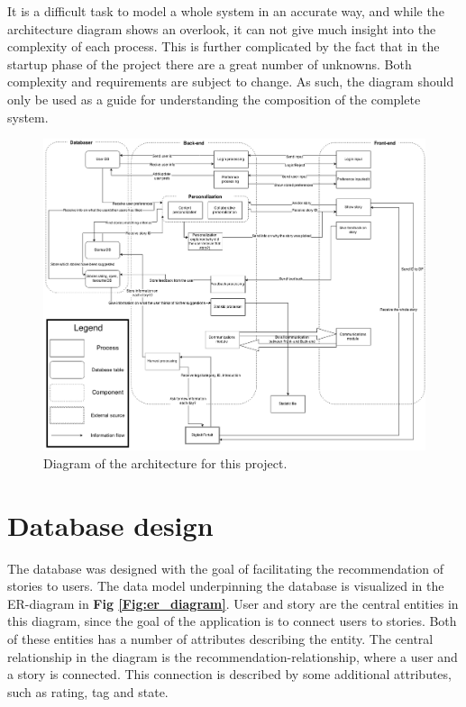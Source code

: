 It is a difficult task to model a whole system in an accurate way, and while the architecture diagram shows an overlook, it can not give much insight into the complexity of each process. This is further complicated by the fact that in the startup phase of the project there are a great number of unknowns. Both complexity and requirements are subject to change. As such, the diagram should only be used as a guide for understanding the composition of the complete system.

\begin{figure}[h!]
	\centering
	\includegraphics[width=\textwidth]{fig/architecture}
	\caption{Diagram of the architecture for this project.}
	\label{Fig:architecture}
\end{figure}

\section{Database design}
\label{sec:database_design}

The database was designed with the goal of facilitating the recommendation of stories to users. The data model underpinning the database is visualized in the ER-diagram in \textbf{Fig \ref{Fig:er_diagram}}. User and story are the central entities in this diagram, since the goal of the application is to connect users to stories. Both of these entities has a number of attributes describing the entity. The central relationship in the diagram is the recommendation-relationship, where a user and a story is connected. This connection is described by some additional attributes, such as rating, tag and state. \newline

